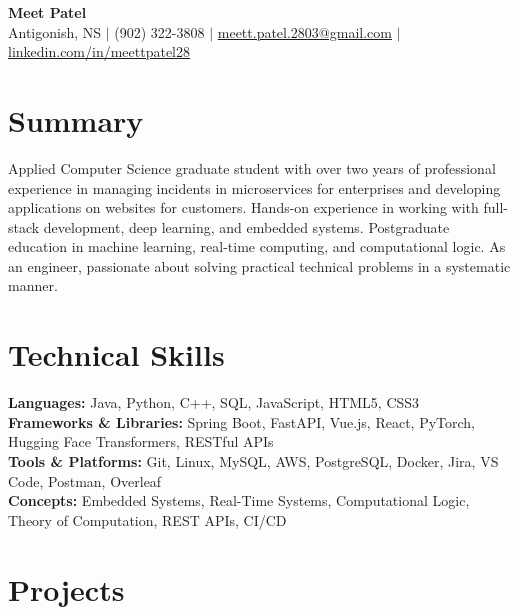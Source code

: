 \documentclass[10pt, letterpaper]{article}
\begin{document}
\begin{center}
  {\LARGE \textbf{Meet Patel}} \\[3pt]
  \small
  Antigonish, NS $\vert$
  (902) 322-3808 $\vert$
  \href{mailto:meett.patel.2803@gmail.com}{meett.patel.2803@gmail.com} $\vert$
  \href{https://linkedin.com/in/meettpatel28}{linkedin.com/in/meettpatel28}
\end{center}

\section{Summary}
\small

Applied Computer Science graduate student with over two years of professional experience in managing incidents in microservices for enterprises and developing applications on websites for customers. Hands-on experience in working with full-stack development, deep learning, and embedded systems. Postgraduate education in machine learning, real-time computing, and computational logic. As an engineer, passionate about solving practical technical problems in a systematic manner.

\vspace{1pt}

\section{Technical Skills}
\small
\textbf{Languages:} Java, Python, C++, SQL, JavaScript, HTML5, CSS3 \\
\textbf{Frameworks \& Libraries:} Spring Boot, FastAPI, Vue.js, React, PyTorch, Hugging Face Transformers, RESTful APIs \\
\textbf{Tools \& Platforms:} Git, Linux, MySQL, AWS, PostgreSQL, Docker, Jira, VS Code, Postman, Overleaf \\
\textbf{Concepts:} Embedded Systems, Real-Time Systems, Computational Logic, Theory of Computation, REST APIs, CI/CD

\vspace{1pt}

\section{Projects}
\end{document}
